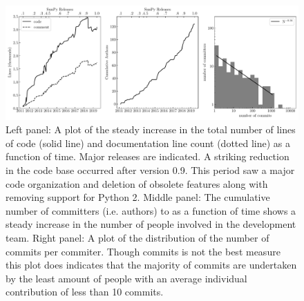 \begin{figure}
    \center
    \includegraphics[width = 1.0\textwidth]{figures/dev_meta.pdf}
    \caption{Left panel: A plot of the steady increase in the total number of lines of code (solid line) and documentation line count (dotted line) as a function of time.
	Major releases are indicated.
	A striking reduction in the code base occurred after version 0.9.
	This period saw a major code organization and deletion of obsolete features along with removing support for Python 2.
	Middle panel: The cumulative number of committers (i.e. authors) to \sunpypkg as a function of time shows a steady increase in the number of people involved in the development team.
	Right panel: A plot of the distribution of the number of commits per commiter.
	Though commits is not the best measure this plot does indicates that the majority of commits are undertaken by the least amount of people with an average individual contribution of less than 10 commits.}
\label{fig:metafig}
\end{figure}

